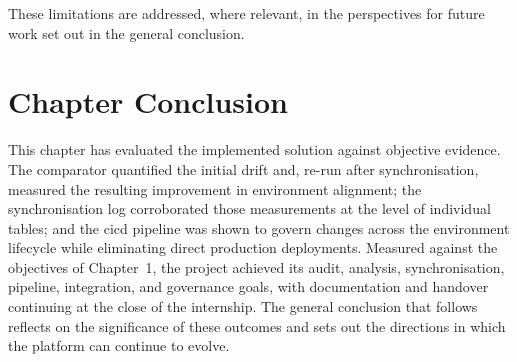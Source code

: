 These limitations are addressed, where relevant, in the perspectives for future work set out in the general conclusion.

\section*{Chapter Conclusion}

This chapter has evaluated the implemented solution against objective evidence. The comparator quantified the initial drift and, re-run after synchronisation, measured the resulting improvement in environment alignment; the synchronisation log corroborated those measurements at the level of individual tables; and the \gls{cicd} pipeline was shown to govern changes across the environment lifecycle while eliminating direct production deployments. Measured against the objectives of Chapter~1, the project achieved its audit, analysis, synchronisation, pipeline, integration, and governance goals, with documentation and handover continuing at the close of the internship. The general conclusion that follows reflects on the significance of these outcomes and sets out the directions in which the platform can continue to evolve.

\newpage
